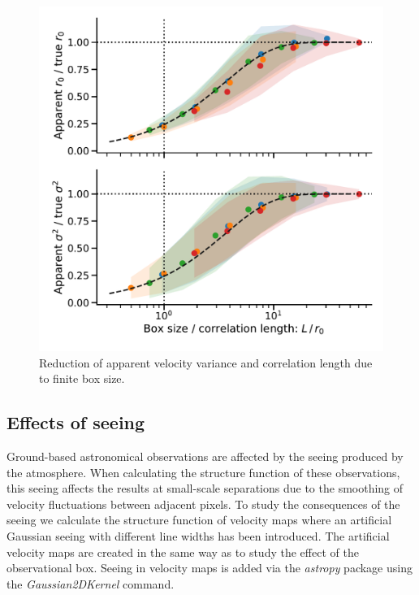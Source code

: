 \documentclass[fleqn,usenatbib, useAMS, a4paper]{mnras}
\begin{document}
\begin{figure}
  \includegraphics[width=\linewidth]{Figures/fake-finite-box-effect}
  \caption{
    Reduction of apparent velocity variance and correlation length
    due to finite box size.
  }
  \label{fig:finite-box-effect}
\end{figure}



\subsection{Effects of seeing}
\label{sec:effects-seeing-struc}

Ground-based astronomical observations are affected by the seeing produced by the atmosphere.
When calculating the structure function of these observations, this seeing affects the results at small-scale separations due to the smoothing of velocity fluctuations between adjacent pixels.
To study the consequences of the seeing we calculate the structure function of velocity maps where an artificial Gaussian seeing with different line widths has been introduced.
The artificial velocity maps are created in the same way as to study the effect of the observational box.
Seeing in velocity maps is added via the \textit{astropy} package using the \textit{Gaussian2DKernel} command. 
\end{document}
